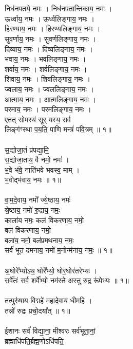 \section{}
निध॑नपतये॒ नमः । निध॑नपतान्तिकाय॒ नमः ।\\
ऊर्ध्वाय॒ नमः । ऊर्ध्वलिङ्गाय॒ नमः ।\\
हिरण्याय॒ नमः । हिरण्यलिङ्गाय॒ नमः ।\\
सुवर्णाय॒ नमः । सुवर्णलिङ्गाय॒ नमः ।\\
दिव्याय॒ नमः । दिव्यलिङ्गाय॒ नमः ।\\
भवाय॒ नमः । भवलिङ्गाय॒ नमः ।\\
शर्वाय॒ नमः । शर्वलिङ्गाय॒ नमः ।\\
शिवाय॒ नमः । शिवलिङ्गाय॒ नमः ।\\
ज्वलाय॒ नमः । ज्वललिङ्गाय॒ नमः ।\\
आत्माय॒ नमः । आत्मलिङ्गाय॒ नमः ।\\
परमाय॒ नमः । परमलिङ्गाय॒ नमः ।\\
एतत्  सोमस्य॑ सूर् यस्य॒ सर्व\\
लिङ्ग॑ꣳस्था प॒य॒ति॒ पाणि मन्त्रं॑ पवि॒त्रम् ॥ १॥\\
\\
स॒द्योजा॒तं प्र॑पद्या॒मि॒\\
स॒द्योजा॒ताय॒ वै नमो॒ नमः॑ ।\\
भ॒वे भ॑वे॒ नाति॑भवे भवस्व॒ माम् ।\\
भ॒वोद्भ॑वाय॒ नमः ॥ १॥\\
\\
वा॒म॒दे॒वाय॒ नमो᳚ ज्ये॒ष्ठाय॒ नमः॑\\
श्रे॒ष्ठाय॒ नमो॑ रु॒द्राय॒ नमः॒\\
काला॑य नमः॒ कल॑ विकरणाय॒ नमो॒\\
बल॑ विकरणाय॒ नमो॒\\
बला॑य॒ नमो॒ बल॑प्रमथनाय॒ नमः॒\\
सर्व॑ भूत दमनाय॒ नमो॑ म॒नोन्म॑नाय॒ नमः॒ ॥ १॥\\
\\
अ॒घोरे᳚भ्योऽथ॒ घोरे᳚भ्यो॒ घोर॒घोर॑तरेभ्यः ।\\
स॒र्वे᳚तः॑ सर्व॒ शर्वे᳚भ्यो॒ नम॑स्ते अस्तु रु॒द्र रू॑पेभ्यः ॥ १॥\\
\\
तत्पुरु॑षाय वि॒द्महे॑ महादे॒वाय॑ धीमहि ।\\
तन्नो॑ रुद्रः प्रचो॒दया᳚त् ॥ १॥\\
\\
ईशानः सर्व॑ विद्या॒ना॒ मीश्वरः सर्व॑भूता॒नां॒\\
ब्रह्माधि॑पति॒र्ब्रह्म॒णोऽधि॑पति॒\\
